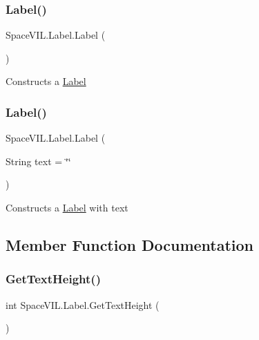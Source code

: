\subsubsection{\texorpdfstring{Label()}{Label()}\hspace{0.1cm}{\footnotesize\ttfamily [1/2]}}
{\footnotesize\ttfamily Space\+V\+I\+L.\+Label.\+Label (\begin{DoxyParamCaption}{ }\end{DoxyParamCaption})\hspace{0.3cm}{\ttfamily [inline]}}



Constructs a \mbox{\hyperlink{class_space_v_i_l_1_1_label}{Label}} 

\mbox{\label{class_space_v_i_l_1_1_label_a6b91b2ddcbc0d66e667d6a15abaa2493}} 
\subsubsection{\texorpdfstring{Label()}{Label()}\hspace{0.1cm}{\footnotesize\ttfamily [2/2]}}
{\footnotesize\ttfamily Space\+V\+I\+L.\+Label.\+Label (\begin{DoxyParamCaption}\item[{String}]{text = {\ttfamily \char`\"{}\char`\"{}} }\end{DoxyParamCaption})\hspace{0.3cm}{\ttfamily [inline]}}



Constructs a \mbox{\hyperlink{class_space_v_i_l_1_1_label}{Label}} with text 



\subsection{Member Function Documentation}
\mbox{\label{class_space_v_i_l_1_1_label_a1428755f295e8cfd6b553b6d871615eb}} 
\subsubsection{\texorpdfstring{Get\+Text\+Height()}{GetTextHeight()}}
{\footnotesize\ttfamily int Space\+V\+I\+L.\+Label.\+Get\+Text\+Height (\begin{DoxyParamCaption}{ }\end{DoxyParamCaption})\hspace{0.3cm}{\ttfamily [inline]}}



